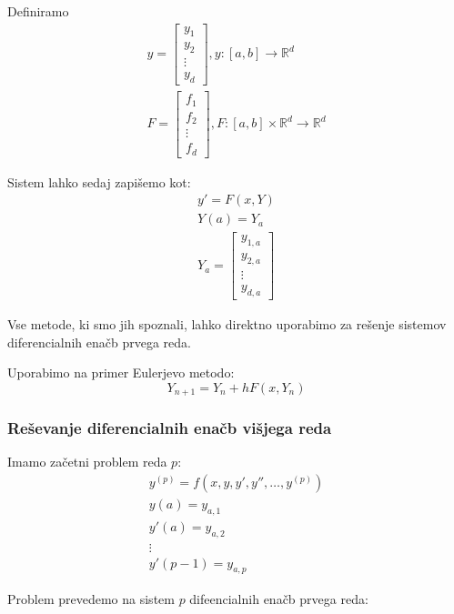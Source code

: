 \documentclass[a4paper,12pt]{article}
\theoremstyle{definition}
\theoremstyle{remark}
\newcommand{\R}{\mathbb{R}}
\begin{document}
Definiramo
\begin{gather*}
    y = \begin{bmatrix}
        y_1 \\
        y_2 \\
        \vdots \\
        y_d
    \end{bmatrix}, y: [a, b] \to \R^d \\
    F = \begin{bmatrix}
        f_1 \\
        f_2 \\
        \vdots \\
        f_d
    \end{bmatrix}, 
    F: [a, b]\times \R^d \to \R^d
\end{gather*}

Sistem lahko sedaj zapišemo kot:
\begin{gather*}
    y' = F(x, Y) \\
    Y(a) = Y_a \\
    Y_a = \begin{bmatrix}
        y_{1, a} \\
        y_{2, a} \\
        \vdots \\
        y_{d, a}
    \end{bmatrix}
\end{gather*}

Vse metode, ki smo jih spoznali, lahko direktno uporabimo za rešenje sistemov diferencialnih enačb prvega reda.

Uporabimo na primer Eulerjevo metodo:
\begin{equation*}
    Y_{n+1} = Y_n + h F(x, Y_n)
\end{equation*}

\subsubsection{Reševanje diferencialnih enačb višjega reda}
Imamo začetni problem reda $p$:
\begin{gather*}
    y^{(p)} = f(x, y, y', y'', \dots, y^{(p)}) \\
    y(a) = y_{a, 1} \\
    y'(a) = y_{a, 2} \\
    \vdots \\
    y'{(p-1)} = y_{a, p}
\end{gather*}

Problem prevedemo na sistem $p$ difeencialnih enačb prvega reda:
\end{document}
